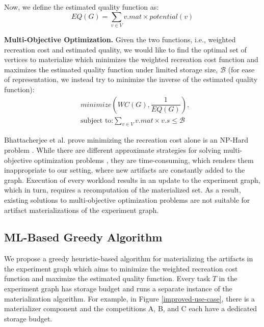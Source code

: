 Now, we define the estimated quality function as:
\[
EQ(G) =  \sum\limits_{v \in V}  v.mat \times potential(v)
\]

\textbf{Multi-Objective Optimization.}
Given the two functions, i.e., weighted recreation cost and estimated quality, we would like to find the optimal set of vertices to materialize which minimizes the weighted recreation cost function and maximizes the estimated quality function under limited storage size, $\mathcal{B}$ (for ease of representation, we instead try to minimize the inverse of the estimated quality function):
\begin{equation}
\begin{split}
& minimize(WC(G), \dfrac{1}{EQ(G)}), \\
& \text{subject to:} \sum\limits_{v \in V} v.mat \times v.s \leq \mathcal{B}
\end{split}
\end{equation}

Bhattacherjee et al. prove minimizing the recreation cost alone is an NP-Hard problem \cite{bhattacherjee2015principles}.
While there are different approximate strategies for solving multi-objective optimization problems \cite{coello2007evolutionary}, they are time-consuming, which renders them inappropriate to our setting, where new artifacts are constantly added to the graph.
Execution of every workload results in an update to the experiment graph, which in turn, requires a recomputation of the materialized set.
As a result, existing solutions to multi-objective optimization problems are not suitable for artifact materializations of the experiment graph.

\subsection{ML-Based Greedy Algorithm}\label{subsec-ml-based-materialization}
We propose a greedy heuristic-based algorithm for materializing the artifacts in the experiment graph which aims to minimize the weighted recreation cost function and maximize the estimated quality function.
Every task $T$ in the experiment graph has storage budget and runs a separate instance of the materialization algorithm.
For example, in Figure \ref{improved-use-case}, there is a materializer component and the competitions A, B, and C each have a dedicated storage budget.

